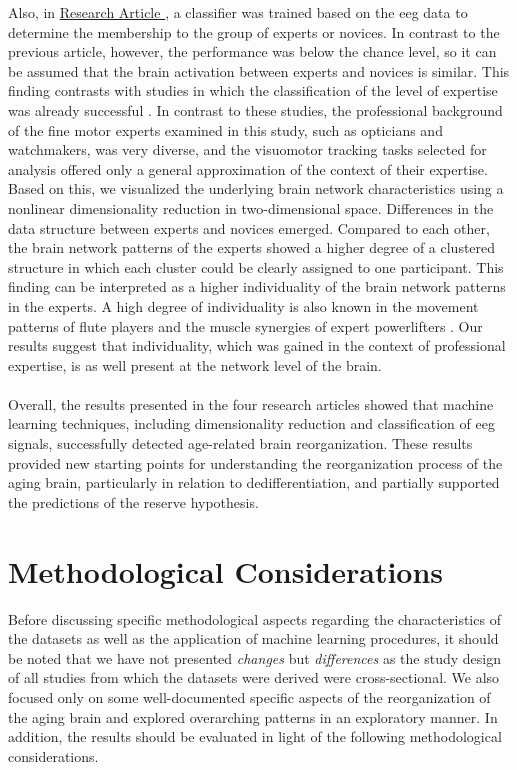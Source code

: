 Also, in \hyperref[results:paperIV]{Research Article }, a classifier was trained based on the \gls{eeg} data to determine the membership to the group of experts or novices. In contrast to the previous article, however, the performance was below the chance level, so it can be assumed that the brain activation between experts and novices is similar. This finding contrasts with studies in which the classification of the level of expertise was already successful \cite{Hosp2021, Winkler-Schwartz2019, Shourie2016}. In contrast to these studies, the professional background of the fine motor experts examined in this study, such as opticians and watchmakers, was very diverse, and the visuomotor tracking tasks selected for analysis offered only a general approximation of the context of their expertise. Based on this, we visualized the underlying brain network characteristics using a nonlinear dimensionality reduction in two-dimensional space. Differences in the data structure between experts and novices emerged. Compared to each other, the brain network patterns of the experts showed a higher degree of a clustered structure in which each cluster could be clearly assigned to one participant. This finding can be interpreted as a higher individuality of the brain network patterns in the experts. A high degree of individuality is also known in the movement patterns of flute players and the muscle synergies of expert powerlifters \cite{Albrecht2014, Caramiaux2018, Kristiansen2015}. Our results suggest that individuality, which was gained in the context of professional expertise, is as well present at the network level of the brain.\\
\\
Overall, the results presented in the four research articles showed that machine learning techniques, including dimensionality reduction and classification of \gls{eeg} signals, successfully detected age-related brain reorganization. These results provided new starting points for understanding the reorganization process of the aging brain, particularly in relation to dedifferentiation, and partially supported the predictions of the reserve hypothesis.

\section{Methodological Considerations}
Before discussing specific methodological aspects regarding the characteristics of the datasets as well as the application of machine learning procedures, it should be noted that we have not presented \textit{changes} but \textit{differences} as the study design of all studies from which the datasets were derived were cross-sectional. We also focused only on some well-documented specific aspects of the reorganization of the aging brain and explored overarching patterns in an exploratory manner. In addition, the results should be evaluated in light of the following methodological considerations. 

